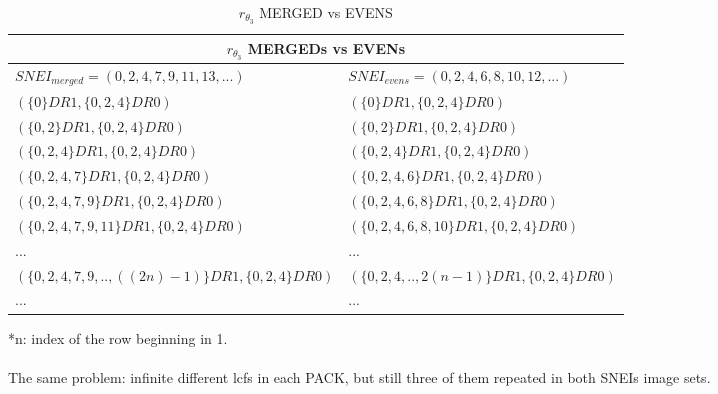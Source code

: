 	\begin{table}[h!]
		\begin{center}
			\begin{tabular}{|l||l|}
				\hline
				\multicolumn{2}{|c|}{\cellcolor{lightgray} {$r_{\theta_{3}}$ MERGEDs vs EVENs } } \\
				\hline
				$SNEI_{merged} = (0,2,4,7,9,11,13,...)$ & $ SNEI_{evens} = (0,2,4,6,8,10,12,...)$   \\
				\hline
				\hline
				\cellcolor{bosunired!50}  $ ( \{0\}DR1, \{0,2,4\}DR0 ) $        & \cellcolor{bosunired!50}  $ ( \{0\}DR1, \{0,2,4\}DR0 ) $ \\
				\hline
				\cellcolor{bosunired!50}  $ ( \{0,2\}DR1, \{0,2,4\}DR0 ) $      & \cellcolor{bosunired!50}  $ ( \{0,2\}DR1, \{0,2,4\}DR0 ) $ \\
				\hline
				\cellcolor{bosunired!50}  $ ( \{0,2,4\}DR1, \{0,2,4\}DR0 ) $    & \cellcolor{bosunired!50}  $ ( \{0,2,4\}DR1, \{0,2,4\}DR0 ) $ \\
				\hline
				\cellcolor{applegreen!50} $ ( \{0,2,4,7\}DR1, \{0,2,4\}DR0 ) $  & \cellcolor{applegreen!50} $ ( \{0,2,4,6\}DR1, \{0,2,4\}DR0 ) $ \\
				\hline
				$ ( \{0,2,4,7,9\}DR1, \{0,2,4\}DR0 ) $ & $ ( \{0,2,4,6,8\}DR1, \{0,2,4\}DR0 ) $ \\
				\hline
				$ ( \{0,2,4,7,9,11\}DR1, \{0,2,4\}DR0 ) $ & $ ( \{0,2,4,6,8,10\}DR1, \{0,2,4\}DR0 ) $ \\
				\hline
				... & ... \\
				\hline
				$ (\{0,2,4,7,9,.., ((2n)-1)\}DR1, \{0,2,4\}DR0 )$ & $ (\{0,2,4,.., 2(n-1) \}DR1, \{0,2,4\}DR0 )$ \\
				\hline
				... & ... \\
				\hline
				
			\end{tabular}
			\caption{$r_{\theta_{3}}$  MERGED vs EVENS}
			\label{tab: r_theta_3_merged_vs_evens}
		\end{center}
	\end{table}
	
	\noindent
	*n: index of the row beginning in 1.
	\\\\
	
	\noindent
	The same problem: infinite different lcfs in each PACK, but still three of them repeated in both SNEIs image sets.
	
